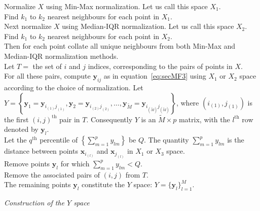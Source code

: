 \documentclass[a4paper,11pt]{article}
\begin{document}
\DontPrintSemicolon
\begin{algorithm}\fontsize{9}{10}\selectfont
	Normalize $X$ using Min-Max normalization. Let us call this space $X_1$.  \\
	Find $k_1$ to $k_2$ nearest neighbours for each point in  $X_1$. \\
	Next normalize $X$ using Median-IQR normalization. Let us call this space $X_2$.  \\
	Find $k_1$ to $k_2$ nearest neighbours for each point in  $X_2$. \\
	Then for each point collate all unique neighbours from both Min-Max and Median-IQR normalization methods.   \\
	Let $T = $ the set of $i$ and $j$ indices, corresponding to the pairs of points in $X$. \\
	For all these pairs, compute $\bm{y}_{ij}$ as in equation~\eqref{eq:secMF3} using $X_1$ or $X_2$ space according to the choice of normalization. Let $Y =\left\{ \bm{y}_{1} =\bm{y}_{i_{(1)}j_{(1)}} , \bm{y}_{2} =\bm{y}_{i_{(2)}j_{(2)}}, \ldots, \bm{y}_{\tilde{M}} =\bm{y}_{i_{(\tilde{M})}j_{(\tilde{M})}} \right\}$, where $\left( i_{(1)},j_{(1)} \right)$ is the first $(i, j)^{\text{th}}$ pair in $T$. Consequently $Y$ is an $\tilde{M}\times p$ matrix, with the $l^{\text{th}}$ row denoted by $\bm{y}_l$.\\
	Let the $q^{\text{th}}$ percentile of $ \left\{\sum_{m=1}^p {y}_{lm}\right\}$ be $Q$. The quantity $\sum_{m=1}^p {y}_{lm}$ is the distance between points $\bm{x}_{i_{(l)}}$ and $\bm{x}_{j_{(l)}}$ in  $X_1$ or $X_3$  space. \\
	Remove points $\bm{y}_l$ for which  $  \sum_{m=1}^p {y}_{lm}  < Q $. \\
	Remove the associated pairs of $(i, j)$ from $T$. \\
	The remaining points $\bm{y}_l$ constitute the $Y$ space: $Y = \{\bm{y}_l \}_{l=1}^M$.
	\caption{\itshape Construction of the $Y$ space}
	\label{algo:YSpace}
\end{algorithm}
\end{document}
